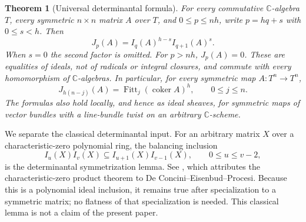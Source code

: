 \documentclass[11pt,reqno]{amsart}
\numberwithin{equation}{section}
\newtheorem{theorem}{Theorem}[section]
\theoremstyle{definition}\newtheorem{definition}[theorem]{Definition}
\theoremstyle{remark}\newtheorem{remark}[theorem]{Remark}
\newcommand{\C}{\mathbb C}\newcommand{\Q}{\mathbb Q}
\DeclareMathOperator{\Fitt}{Fitt}\DeclareMathOperator{\Ann}{Ann}
\DeclareMathOperator{\coker}{coker}\DeclareMathOperator{\codim}{codim}
\begin{document}
\begin{theorem}[Universal determinantal formula]
\label{thm:universal-power-v157}
For every commutative $\C$-algebra $T$, every symmetric $n\times n$
matrix $A$ over $T$, and $0\leq p\leq nh$, write $p=hq+s$ with
$0\leq s<h$. Then
\begin{equation}\label{eq:universal-power-v157}
             J_p(A)=I_q(A)^{h-s}I_{q+1}(A)^s.
\end{equation}
When $s=0$ the second factor is omitted. For $p>nh$, $J_p(A)=0$.
These are equalities of ideals, not of radicals or integral closures,
and commute with every homomorphism of $\C$-algebras. In particular,
for every symmetric map $A:T^n\to T^n$,
\begin{equation}\label{eq:universal-Fitting-v157}
       J_{h(n-j)}(A)=\Fitt_j(\coker A)^h,\qquad 0\leq j\leq n.
\end{equation}
The formulas also hold locally, and hence as ideal sheaves, for
symmetric maps of vector bundles with a line-bundle twist on an
arbitrary $\C$-scheme.
\end{theorem}

We separate the classical determinantal input. For an arbitrary matrix
$X$ over a characteristic-zero polynomial ring, the balancing inclusion
\begin{equation}\label{eq:minor-balancing-v157}
              I_u(X)I_v(X)\subseteq I_{u+1}(X)I_{v-1}(X),
              \qquad 0\leq u\leq v-2,
\end{equation}
is the determinantal symmetrization lemma. See
\cite[Lemma~2.5 and Theorem~2.4]{BrunsConca2003}, which attributes the
characteristic-zero product theorem to De Concini--Eisenbud--Procesi.
Because this is a polynomial ideal inclusion, it remains true after
specialization to a symmetric matrix; no flatness of that specialization
is needed. This classical lemma is not a claim of the present paper.
\end{document}
